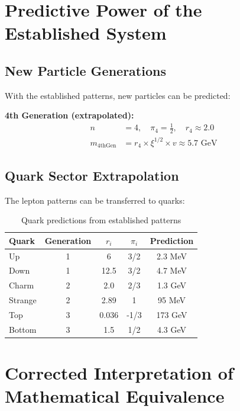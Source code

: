 	\section{Predictive Power of the Established System}
	\label{sec:predictive_power}
	
	\subsection{New Particle Generations}
	\label{subsec:new_generations}
	
	With the established patterns, new particles can be predicted:
	
	\textbf{4th Generation (extrapolated):}
	\begin{align}
		n &= 4, \quad \pi_4 = \frac{1}{2}, \quad r_4 \approx 2.0 \\
		m_{\text{4thGen}} &= r_4 \times \xi^{1/2} \times v \approx 5.7 \text{ GeV}
	\end{align}
	
	\subsection{Quark Sector Extrapolation}
	\label{subsec:quark_extrapolation}
	
	The lepton patterns can be transferred to quarks:
	
	\begin{table}[H]
		\centering
		\begin{tabular}{lcccc}
			\toprule
			\textbf{Quark} & \textbf{Generation} & \textbf{$r_i$} & \textbf{$\pi_i$} & \textbf{Prediction} \\
			\midrule
			Up & 1 & 6 & 3/2 & 2.3 MeV \\
			Down & 1 & 12.5 & 3/2 & 4.7 MeV \\
			Charm & 2 & 2.0 & 2/3 & 1.3 GeV \\
			Strange & 2 & 2.89 & 1 & 95 MeV \\
			Top & 3 & 0.036 & -1/3 & 173 GeV \\
			Bottom & 3 & 1.5 & 1/2 & 4.3 GeV \\
			\bottomrule
		\end{tabular}
		\caption{Quark predictions from established patterns}
		\label{tab:quark_predictions}
	\end{table}
	
	\section{Corrected Interpretation of Mathematical Equivalence}
	\label{sec:corrected_interpretation}
	

